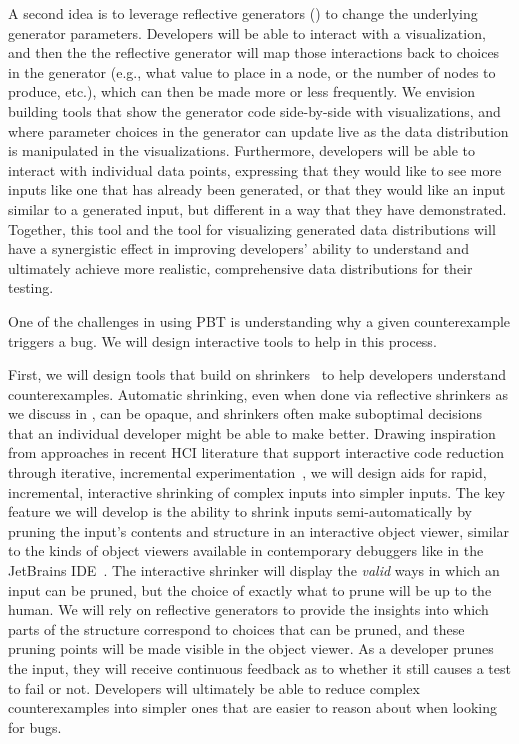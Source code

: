A second idea is to leverage
reflective generators () to change the underlying
generator parameters. Developers will be able to interact with a visualization,
and then the the reflective generator will map those interactions
back to choices
in the generator (e.g., what value to place in a node, or the number of nodes to
produce, etc.), which can then be made more or less frequently. We envision
building tools that show the generator code
side-by-side with visualizations, and where parameter choices in the generator
can update live as the data distribution is manipulated in the visualizations.
Furthermore, developers will be able to interact with individual data points,
expressing that they would like to see more inputs like one that has already
been generated, or that they would like an input similar to a generated input,
but different in a way that they have demonstrated. Together, this tool and the
tool for visualizing generated data distributions will have a synergistic effect
in improving developers' ability to understand and ultimately achieve more
realistic, comprehensive data distributions for their testing.


%
One of the challenges in using PBT is understanding why
a given counterexample triggers a bug.  We will design interactive
tools to help in this process.

First, we will design tools that build on
shrinkers~\cite{hughes_quickcheck_2007,arts_shrinking_2014} to help developers
understand counterexamples. Automatic shrinking, even when done via reflective
shrinkers as we discuss in , can be opaque, and
shrinkers often make suboptimal decisions that an individual developer might be
able to make better.
Drawing inspiration from approaches in recent HCI literature that support
interactive code reduction through iterative, incremental
experimentation~\cite{ref:lim2018ply,ref:head2018interactive,ref:holmes2012systematizing,ref:hibschman2016telescope},
we will design aids for rapid, incremental, interactive shrinking of complex
inputs into simpler inputs. The key feature we will develop is the ability to
shrink inputs semi-automatically by pruning the input's contents and structure in an interactive
object viewer, similar to the kinds of object viewers available in contemporary
debuggers like in the JetBrains IDE~\cite{tool:jetbrains}.
The interactive shrinker will display the \emph{valid} ways
in which an input can be pruned, but the choice of exactly what to prune will be
up to the human. We will rely on reflective generators to provide the insights
into which parts of the structure correspond to choices that can be pruned, and
these pruning points will be made
visible in the object viewer. As a developer prunes the input, they will receive
continuous feedback as to whether it still causes a test to fail or not.
Developers will ultimately be able to
reduce complex counterexamples into simpler ones that are
easier to reason about when looking for bugs.

